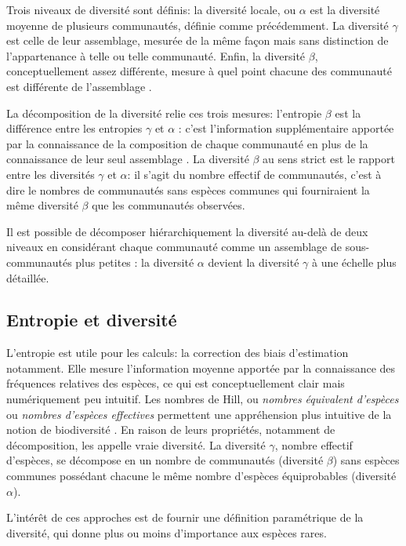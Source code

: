 \documentclass[a4paper]{article}
\begin{document}
Trois niveaux de diversité sont définis: la diversité locale, ou $\alpha$ est la diversité moyenne de plusieurs communautés, définie comme précédemment.
La diversité $\gamma$ est celle de leur assemblage, mesurée de la même façon mais sans distinction de l'appartenance à telle ou telle communauté.
Enfin, la diversité $\beta$, conceptuellement assez différente, mesure à quel point chacune des communauté est différente de l'assemblage \cite{Marcon2012a}.

La décomposition de la diversité relie ces trois mesures: l'entropie $\beta$ est la différence entre les entropies $\gamma$ et $\alpha$ : c'est l'information supplémentaire apportée par la connaissance de la composition de chaque communauté en plus de la connaissance de leur seul assemblage \citep{Marcon2014a}.
La diversité $\beta$ au sens strict est le rapport entre les diversités $\gamma$ et $\alpha$: il s'agit du nombre effectif de communautés, c'est à dire le nombres de communautés sans espèces communes qui fourniraient la même diversité $\beta$ que les communautés observées.

Il est possible de décomposer hiérarchiquement la diversité \citep{Pavoine2015a} au-delà de deux niveaux en considérant chaque communauté comme un assemblage de sous-communautés plus petites : la diversité $\alpha$ devient la diversité $\gamma$ à une échelle plus détaillée.



\subsection{Entropie et diversité}


L'entropie est utile pour les calculs: la correction des biais d'estimation notamment.
Elle mesure l'information moyenne apportée par la connaissance des fréquences relatives des espèces, ce qui est conceptuellement clair mais numériquement peu intuitif.
Les nombres de Hill, ou \emph{nombres équivalent d'espèces} ou \emph{nombres d'espèces effectives} permettent une appréhension plus intuitive de la notion de biodiversité \citep{Jost2006}.
En raison de leurs propriétés, notamment de décomposition, \cite{Jost2007} les appelle \og vraie diversité\fg{}.
La diversité $\gamma$, nombre effectif d'espèces, se décompose en un nombre de communautés (diversité $\beta$) sans espèces communes possédant chacune le même nombre d'espèces équiprobables (diversité $\alpha$).


L'intérêt de ces approches est de fournir une définition paramétrique de la diversité, qui donne plus ou moins d'importance aux espèces rares.
\end{document}
